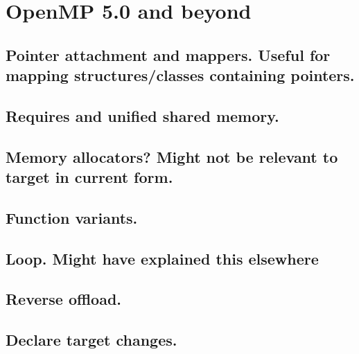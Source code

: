 
\chapter{OpenMP 5.0 and beyond}
\label{chapter:future}

\section{Pointer attachment and mappers. Useful for mapping structures/classes containing pointers.}
\section{Requires and unified shared memory.}
\section{Memory allocators? Might not be relevant to target in current form.}
\section{Function variants.}
\section{Loop. Might have explained this elsewhere}
\section{Reverse offload.}
\section{Declare target changes.}

